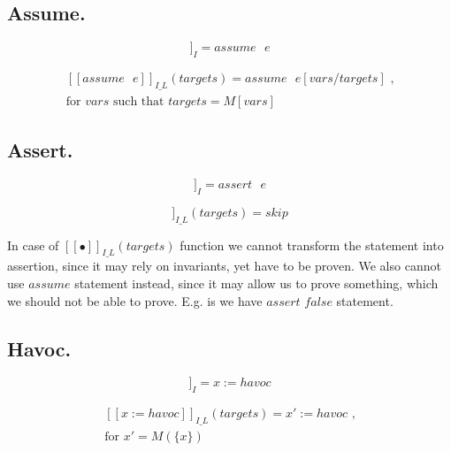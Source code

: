 \documentclass[a4paper,12pt]{article}
\begin{document}
	\subsection{Assume.}
	
	\begin{equation*}
		[[assume \text{ } e]]_{I} = assume \text{ } e 
	\end{equation*}
	
	\begin{equation*}
	\begin{multlined}
		[[assume \text{ } e]]_{I\_L}(targets) = 
		assume \text{ } e[vars / targets] \text{ ,} \\
		\text{for $vars$ such that } targets = M[vars]
	\end{multlined}
	\end{equation*}
	
	\subsection{Assert.}
	
	\begin{equation*}
		[[assert \text{ } e]]_I = assert \text{ } e 
	\end{equation*}

	\begin{equation*}
		[[assert \text{ } e]]_{I\_L}(targets) = skip
	\end{equation*}

	In case of $[[\bullet]]_{I\_L}(targets)$ function we cannot transform the statement into assertion, since it may rely on invariants, yet have to be proven. We also cannot use $assume$ statement instead, since it may allow us to prove something, which we should not be able to prove. E.g. is we have $assert$ $false$ statement. 

	\subsection{Havoc.}
	
	\begin{equation*}
		[[x := havoc]]_I = x := havoc
	\end{equation*}
	
	\begin{equation*}
	\begin{multlined}
		[[x := havoc]]_{I\_L}(targets) = x' := havoc \text{ ,} \\
		\text{for $x' = M(\{x\})$ }
	\end{multlined}
	\end{equation*}
\end{document}
